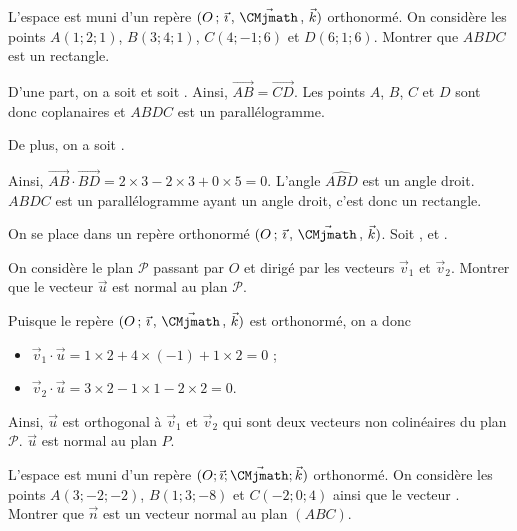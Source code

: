 \documentclass[11pt,fleqn, openany]{book} %
\begin{document}
\begin{exercise}[topic=geom13]L'espace est muni d'un repère $\Oijk$ orthonormé. On considère les points $A(1;2;1)$, $B(3;4;1)$, $C(4;-1;6)$ et $D(6;1;6)$. Montrer que $ABDC$ est un rectangle.\end{exercise}

\begin{solution}D'une part, on a  soit  et  soit . Ainsi, $\overrightarrow{AB}=\overrightarrow{CD}$. Les points $A$, $B$, $C$ et $D$ sont donc coplanaires et $ABDC$ est un parallélogramme.

De plus, on a  soit .

Ainsi, $\overrightarrow{AB} \cdot \overrightarrow{BD} = 2 \times 3 - 2 \times 3 + 0 \times 5 = 0$. L'angle $\widehat{ABD}$ est un angle droit. $ABDC$ est un parallélogramme ayant un angle droit, c'est donc un rectangle.\end{solution}




\begin{exercise}[topic=geom13]On se place dans un repère orthonormé $\Oijk$. Soit ,  et .

On considère le plan $\mathcal{P}$ passant par $O$ et dirigé par les vecteurs $\vec v_1$ et $\vec v_2$.  Montrer que le vecteur $\vec u$ est normal au plan $\mathcal{P}$.\end{exercise}

\begin{solution}Puisque le repère  $\Oijk$ est orthonormé, on a donc
\begin{itemize}
\item $\vec v_1 \cdot \vec u = 1 \times 2 + 4 \times (-1)+ 1\times 2=0$ ;
\item $\vec v_2 \cdot \vec u = 3 \times 2 - 1 \times 1 -2 \times 2 =0$.
\end{itemize}
Ainsi, $\vec u$ est orthogonal à $\vec v_1$ et $\vec v_2$ qui sont deux vecteurs non colinéaires du plan $\mathcal{P}$. $\vec u$ est normal au plan $P$.\end{solution}



\begin{exercise}[topic=geom13]
 L'espace est muni d'un repère $(O;\vec{\imath}; \vec{\CMjmath}; \vec k)$ orthonormé. On considère les points $A(3;-2;-2)$, $B(1;3;-8)$ et $C(-2;0;4)$ ainsi que le vecteur . Montrer que $\vec n$ est un vecteur normal au plan $(ABC)$.
\end{exercise}
\end{document}

